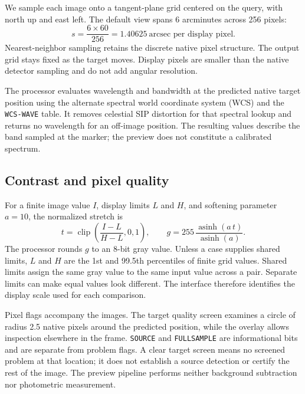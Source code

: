 \documentclass[11pt,letterpaper]{article}
\begin{document}
We sample each image onto a tangent-plane grid centered on the query, with north up and east left. The default view spans 6 arcminutes across 256 pixels:
\begin{equation}
 s=\frac{6\times60}{256}=1.40625\ \text{arcsec per display pixel}.
 \label{eq:scale}
\end{equation}
Nearest-neighbor sampling retains the discrete native pixel structure. The output grid stays fixed as the target moves. Display pixels are smaller than the native detector sampling and do not add angular resolution.

The processor evaluates wavelength and bandwidth at the predicted native target position using the alternate spectral world coordinate system (WCS) and the \texttt{WCS-WAVE} table. It removes celestial SIP distortion for that spectral lookup and returns no wavelength for an off-image position. The resulting values describe the band sampled at the marker; the preview does not constitute a calibrated spectrum.

\subsection{Contrast and pixel quality}
For a finite image value $I$, display limits $L$ and $H$, and softening parameter $a=10$, the normalized stretch is
\begin{equation}
 t=\operatorname{clip}\!\left(\frac{I-L}{H-L},0,1\right),\qquad
 g=255\,\frac{\operatorname{asinh}(a\,t)}{\operatorname{asinh}(a)}.
 \label{eq:stretch}
\end{equation}
The processor rounds $g$ to an 8-bit gray value. Unless a case supplies shared limits, $L$ and $H$ are the 1st and 99.5th percentiles of finite grid values. Shared limits assign the same gray value to the same input value across a pair. Separate limits can make equal values look different. The interface therefore identifies the display scale used for each comparison.

Pixel flags accompany the images. The target quality screen examines a circle of radius 2.5 native pixels around the predicted position, while the overlay allows inspection elsewhere in the frame. \texttt{SOURCE} and \texttt{FULLSAMPLE} are informational bits and are separate from problem flags. A clear target screen means no screened problem at that location; it does not establish a source detection or certify the rest of the image. The preview pipeline performs neither background subtraction nor photometric measurement.
\end{document}
